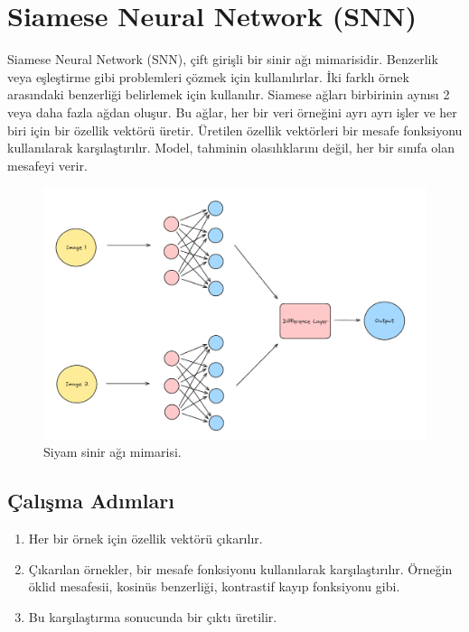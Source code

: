 \section{Siamese Neural Network (SNN)}
Siamese Neural Network (SNN), çift girişli bir sinir ağı mimarisidir. Benzerlik veya eşleştirme gibi problemleri çözmek için kullanılırlar. İki farklı örnek arasındaki benzerliği belirlemek için kullanılır. Siamese ağları birbirinin aynısı 2 veya daha fazla ağdan oluşur. Bu ağlar, her bir veri örneğini ayrı ayrı işler ve her biri için bir özellik vektörü üretir. Üretilen özellik vektörleri bir mesafe fonksiyonu kullanılarak karşılaştırılır. Model, tahminin olasılıklarını değil, her bir sınıfa olan mesafeyi verir. 

\begin{figure}[h]
    \centering
    \includegraphics[width=1\textwidth]{images/siamese_neural_network.png}
    \caption{Siyam sinir ağı mimarisi.}
    \label{fig:enter-label}
\end{figure}

\subsection{Çalışma Adımları}
\begin{enumerate}
    \item Her bir örnek için özellik vektörü çıkarılır.
    \item Çıkarılan örnekler, bir mesafe fonksiyonu kullanılarak karşılaştırılır. Örneğin öklid mesafesii, kosinüs benzerliği, kontrastif kayıp fonksiyonu gibi.
    \item Bu karşılaştırma sonucunda bir çıktı üretilir.
\end{enumerate}

\newpage